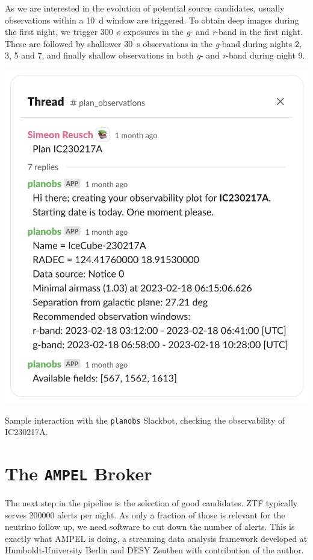 \documentclass[
    a4paper, %
    fontsize=10pt, %
    twoside=true, %
    numbers=noenddot, %
    fontmethod=tex,
]{kaobook}
\begin{document}
As we are interested in the evolution of potential source candidates, usually observations within a \SI{10}{\day} window are triggered. To obtain deep images during the first night, we trigger \SI{300}{\second} exposures in the \textit{g}- and \textit{r}-band in the first night. These are followed by shallower \SI{30}{\second} observations in the \textit{g}-band during nights 2, 3, 5 and 7, and finally shallow observations in both \textit{g}- and \textit{r}-band during night 9.
\begin{marginfigure}
    \includegraphics{fu/planobs_slack_border.pdf}
    \caption[\texttt{planobs} Slackbot interaction]{Sample interaction with the \texttt{planobs} Slackbot, checking the observability of IC230217A.}
\end{marginfigure} 
\section{The \texttt{AMPEL} Broker} \label{ampel}
The next step in the pipeline is the selection of good candidates. ZTF typically serves 200000 alerts per night. As only a fraction of those is relevant for the neutrino follow up, we need software to cut down the number of alerts. This is exactly what AMPEL is doing, a streaming data analysis framework developed at Humboldt-University Berlin and DESY Zeuthen with contribution of the author.
\end{document}
